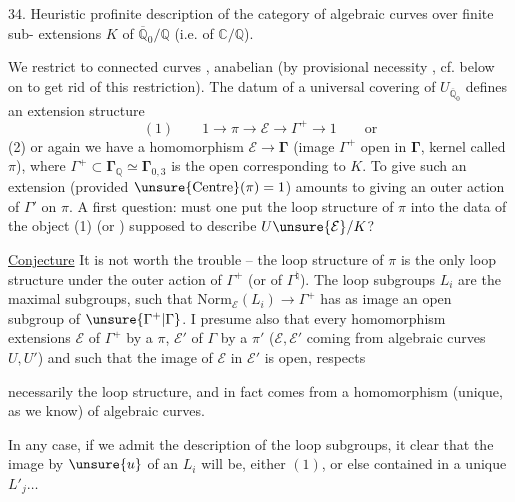 34. Heuristic profinite description of the category
of algebraic curves  over  finite sub-
extensions $K$ of $\overline{\mathbb Q}_0/\mathbb Q$ (i.e. of $\mathbb C/\mathbb Q$).

We restrict to  connected curves , anabelian
(by provisional necessity \unsure{!}, cf. below on  to
get rid of this restriction). The datum of a
universal covering of  $U_{\overline{\mathbb Q}_0}$ defines an
extension structure
\[
(1)\qquad 1\longrightarrow\pi\longrightarrow\mathcal E\longrightarrow\Gamma^{+}\longrightarrow1\qquad\text{or}
\]
(2) or again we have a homomorphism $\mathcal E\longrightarrow\boldsymbol{\Gamma}$
(image $\Gamma^{+}$ open in $\boldsymbol{\Gamma}$,
kernel called $\pi$),
where $\Gamma^{+}\subset\boldsymbol{\Gamma}_{\mathbb Q}\simeq\boldsymbol{\Gamma}_{0,3}$ is the open 
corresponding to $K$. To give such an
extension (provided $\unsure{\mathrm{Centre}}(\pi)=1$) amounts to
giving an outer action of $\Gamma'$ on $\pi$.
A first question: must one put the
loop structure of $\pi$ into the  data  of
the object (1) (or ) supposed to describe $U\unsure{\mathcal E}/K$?

\uline{Conjecture} It is not worth the trouble -- the loop structure
of $\pi$ is the only loop structure 
under the outer action of $\Gamma^{+}$ (or of $\Gamma^{\natural}$). The
loop subgroups $L_i$ are the maximal
subgroups, such that $\mathrm{Norm}_{\mathcal E}(L_i)\longrightarrow\Gamma^{+}$ has
as image an open subgroup of $\unsure{\Gamma^{+}|\Gamma}$.
I
presume also that every homomorphism  extensions
$\mathcal E$ of $\Gamma^{+}$ by a $\pi$, $\mathcal E'$ of $\Gamma$ by a $\pi'$
($\mathcal E,\mathcal E'$ coming from algebraic curves $U,U'$) and such
that the image of $\mathcal E$ in $\mathcal E'$ is open, respects

necessarily the loop structure, and in fact
comes from a homomorphism (unique, as we know) of algebraic
curves.

In any case, if we admit the description of the
loop subgroups, it  clear that the image by
$\unsure{u}$ of an $L_i$ will be, either $(1)$, or else contained
in a unique $L'_j\ldots$

